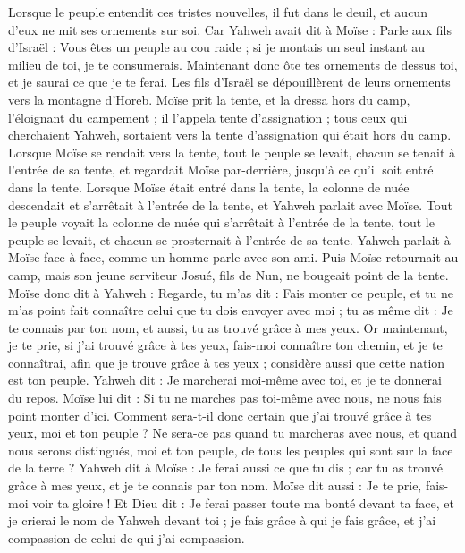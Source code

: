 \begin{multicols}{2}
Lorsque le peuple entendit ces tristes nouvelles, il fut dans le deuil, et aucun d'eux ne mit ses ornements sur soi.
Car Yahweh avait dit à Moïse : Parle aux fils d'Israël : Vous êtes un peuple au cou raide ; si je montais un seul instant au milieu de toi, je te consumerais. Maintenant donc ôte tes ornements de dessus toi, et je saurai ce que je te ferai.
Les fils d'Israël se dépouillèrent de leurs ornements vers la montagne d'Horeb.
Moïse prit la tente, et la dressa hors du camp, l'éloignant du campement ; il l'appela tente d'assignation ; tous ceux qui cherchaient Yahweh, sortaient vers la tente d'assignation qui était hors du camp.
Lorsque Moïse se rendait vers la tente, tout le peuple se levait, chacun se tenait à l'entrée de sa tente, et regardait Moïse par-derrière, jusqu’à ce qu'il soit entré dans la tente.
Lorsque Moïse était entré dans la tente, la colonne de nuée descendait et s'arrêtait à l’entrée de la tente, et Yahweh parlait avec Moïse.
Tout le peuple voyait la colonne de nuée qui s’arrêtait à l’entrée de la tente, tout le peuple se levait, et chacun se prosternait à l’entrée de sa tente.
Yahweh parlait à Moïse face à face, comme un homme parle avec son ami. Puis Moïse retournait au camp, mais son jeune serviteur Josué, fils de Nun, ne bougeait point de la tente.
Moïse donc dit à Yahweh : Regarde, tu m'as dit : Fais monter ce peuple, et tu ne m'as point fait connaître celui que tu dois envoyer avec moi ; tu as même dit : Je te connais par ton nom, et aussi, tu as trouvé grâce à mes yeux.
Or maintenant, je te prie, si j'ai trouvé grâce à tes yeux, fais-moi connaître ton chemin, et je te connaîtrai, afin que je trouve grâce à tes yeux ; considère aussi que cette nation est ton peuple.
Yahweh dit : Je marcherai moi-même avec toi, et je te donnerai du repos.
Moïse lui dit : Si tu ne marches pas toi-même avec nous, ne nous fais point monter d'ici.
Comment sera-t-il donc certain que j’ai trouvé grâce à tes yeux, moi et ton peuple ? Ne sera-ce pas quand tu marcheras avec nous, et quand nous serons distingués, moi et ton peuple, de tous les peuples qui sont sur la face de la terre ?
Yahweh dit à Moïse : Je ferai aussi ce que tu dis ; car tu as trouvé grâce à mes yeux, et je te connais par ton nom.
Moïse dit aussi : Je te prie, fais-moi voir ta gloire !
Et Dieu dit : Je ferai passer toute ma bonté devant ta face, et je crierai le nom de Yahweh devant toi ; je fais grâce à qui je fais grâce, et j'ai compassion de celui de qui j'ai compassion.

\end{multicols}
